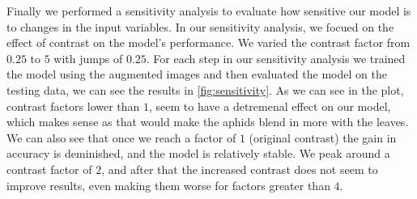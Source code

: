 \documentclass{article}
\begin{document}



Finally we performed a sensitivity analysis to evaluate how sensitive our model is to changes in the input variables. In our sensitivity analysis, 
we focued on the effect of contrast on the model’s performance.
We varied the contrast factor from \(0.25\) to \(5\) with jumps of \(0.25\).
For each step in our sensitivity analysis we trained the model using the augmented images and then evaluated the model
on the testing data, we can see the results in \ref{fig:sensitivity}.
As we can see in the plot, contrast factors lower than \(1\), seem to have a detremenal effect on our model, which makes
sense as that would make the aphids blend in more with the leaves.
We can also see that once we reach a factor of \(1\) (original contrast) the gain in accuracy is deminished, and the 
model is relatively stable. We peak around a contrast factor of \(2\), and after that the increased contrast does not seem
to improve results, even making them worse for factors greater than \(4\).
\end{document}
